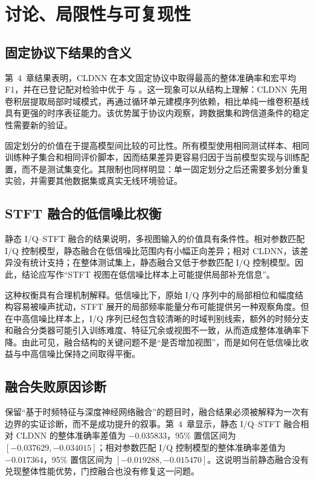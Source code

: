 \chapter{讨论、局限性与可复现性}

\section{固定协议下结果的含义}

第~4~章结果表明，CLDNN 在本文固定协议中取得最高的整体准确率和宏平均 F1\cite{sainath2015cldnn,west2017deep}，并在已登记配对检验中优于 \cite{he2016resnet} 与 。这一现象可以从结构上理解：CLDNN 先用卷积层提取局部时域模式，再通过循环单元建模序列依赖\cite{hochreiter1997lstm}，相比单纯一维卷积基线\cite{oshea2016cnn}具有更强的时序表征能力。该优势属于协议内观察，跨数据集和跨信道条件的稳定性需要新的验证。

固定划分的价值在于提高模型间比较的可比性。所有模型使用相同测试样本、相同训练种子集合和相同评价脚本，因而结果差异更容易归因于当前模型实现与训练配置，而不是测试集变化。其限制也同样明显：单一固定划分之后还需要多划分重复实验，并需要其他数据集或真实无线环境验证。

\section{STFT 融合的低信噪比权衡}

静态 I/Q--STFT 融合的结果说明，多视图输入的价值具有条件性。相对参数匹配 I/Q 控制模型，静态融合在低信噪比范围内有小幅正向差异；相对 CLDNN，该差异没有统计支持；在整体测试集上，静态融合又低于参数匹配 I/Q 控制模型。因此，结论应写作“STFT 视图在低信噪比样本上可能提供局部补充信息”。

这种权衡具有合理机制解释。低信噪比下，原始 I/Q 序列中的局部相位和幅度结构容易被噪声扰动，STFT 展开的局部频率能量分布可能提供另一种观察角度。但在中高信噪比样本上，I/Q 序列已经包含较清晰的时域判别线索，额外的时频分支和融合分类器可能引入训练难度、特征冗余或视图不一致，从而造成整体准确率下降。由此可见，融合结构的关键问题不是“是否增加视图”，而是如何在低信噪比收益与中高信噪比保持之间取得平衡。

\section{融合失败原因诊断}

保留“基于时频特征与深度神经网络融合”的题目时，融合结果必须被解释为一次有边界的实证诊断，而不是成功提升的叙事。第~4~章显示，静态 I/Q--STFT 融合相对 CLDNN 的整体准确率差值为 \(-0.035833\)，95\% 置信区间为 \([-0.037629,-0.034015]\)；相对参数匹配 I/Q 控制模型的整体准确率差值为 \(-0.017364\)，95\% 置信区间为 \([-0.019288,-0.015470]\)。这说明当前静态融合没有兑现整体性能优势，门控融合也没有修复这一问题。

